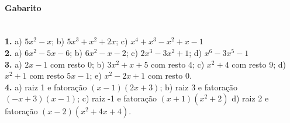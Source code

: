 \documentclass[a4paper,12pt]{article}
\begin{document}
\begin{multicols}{2}
\vspace*{5cm}
\end{multicols}
 
\vspace*{\fill}
{\footnotesize \color{darkgray}
\paragraph*{Gabarito} \hspace*{\fill}\\
\textbf{1.} a) $5x^2 - x$; b) $5x^3 + x^2 + 2x$; c) $x^4 + x^3 - x^2 + x - 1$\\
\textbf{2.} a) $6x^2 -5x - 6$; b) $6x^2 - x - 2$; c) $2x^3 - 3x^2 + 1$; d) $x^6 - 3x^5 - 1$ \\
\textbf{3.} a) $2x - 1$ com resto 0; b) $3x^2 + x + 5$ com resto 4; c) $x^2 + 4$ com resto 9; d) $x^2  + 1$ com resto $5x-1$; e) $x^2-2x+1$ com resto 0.\\
\textbf{4.} a) raiz 1 e fatoração $(x-1)(2x+3)$; b) raiz 3 e fatoração $(-x+3)(x-1)$; c) raiz -1 e fatoração $(x+1)(x^2+2)$ d) raiz 2 e fatoração $(x-2)(x^2+4x+4)$.
}
\end{document}

